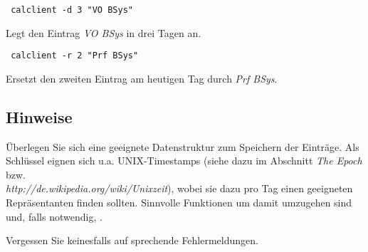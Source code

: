 \begin{verbatim} calclient -d 3 "VO BSys" 
\end{verbatim}
Legt den Eintrag \emph{VO BSys} in drei Tagen an.

\begin{verbatim} calclient -r 2 "Prf BSys" 
\end{verbatim}
Ersetzt den zweiten Eintrag am heutigen Tag durch \emph{Prf BSys}.

\subsection*{Hinweise}
Überlegen Sie sich eine geeignete Datenstruktur zum Speichern der Einträge. Als 
Schlüssel eignen sich u.a. UNIX-Timestamps (siehe dazu  im Abschnitt \emph{The Epoch}
bzw.\\ \emph{http://de.wikipedia.org/wiki/Unixzeit}), wobei sie dazu pro Tag einen geeigneten
Repräsentanten finden sollten. Sinnvolle Funktionen um damit umzugehen sind  und,
falls notwendig, .

Vergessen Sie keinesfalls auf sprechende Fehlermeldungen.

\osueguidelinesthree



